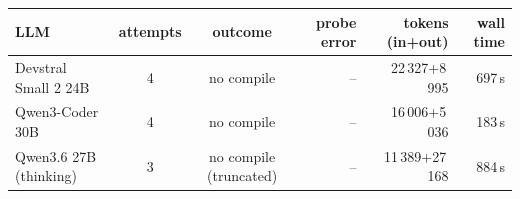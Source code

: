 \begin{tabular}{@{}lccrrr@{}}\toprule
LLM & attempts & outcome & probe error & tokens (in+out) & wall time \\ \midrule
Devstral Small 2 24B & 4 & no compile & -- & 22\,327+8\,995 & 697\,s \\
Qwen3-Coder 30B & 4 & no compile & -- & 16\,006+5\,036 & 183\,s \\
Qwen3.6 27B (thinking) & 3 & no compile (truncated) & -- & 11\,389+27\,168 & 884\,s \\
\bottomrule\end{tabular}
